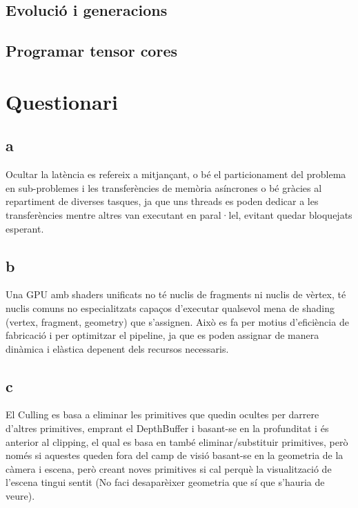 \documentclass[12pt]{article}
\begin{document}
\subsection{Evolució i generacions}

\subsection{Programar tensor cores}






\section{Questionari}

\subsection{a}
Ocultar la latència es refereix a mitjançant, o bé el particionament del problema en sub-problemes i les transferències de memòria asíncrones o bé gràcies al repartiment de diverses tasques, ja que uns threads es poden dedicar a les transferències mentre altres van executant en paral·lel, evitant quedar bloquejats esperant.\cite{graphics_cards_slides}

\subsection{b}
Una GPU amb shaders unificats no té nuclis de fragments ni nuclis de vèrtex, té nuclis comuns no especialitzats capaços d'executar qualsevol mena de shading (vertex, fragment, geometry) que s'assignen. Això es fa per motius d'eficiència de fabricació i per optimitzar el pipeline, ja que es poden assignar de manera dinàmica i elàstica depenent dels recursos necessaris.\cite{wikipedia_unified_shader_model}

\subsection{c}

El Culling es basa a eliminar les primitives que quedin ocultes per darrere d'altres primitives, emprant el DepthBuffer i basant-se en la profunditat i és anterior al clipping, el qual es basa en també eliminar/substituir primitives, però només si aquestes queden fora del camp de visió basant-se en la geometria de la càmera i escena, però creant noves primitives si cal perquè la visualització de l'escena tingui sentit (No faci desaparèixer geometria que sí que s'hauria de veure).
\cite{cgs_exchange_clipping_culling}\cite{tutorialspoint_clipping_culling}
\end{document}
